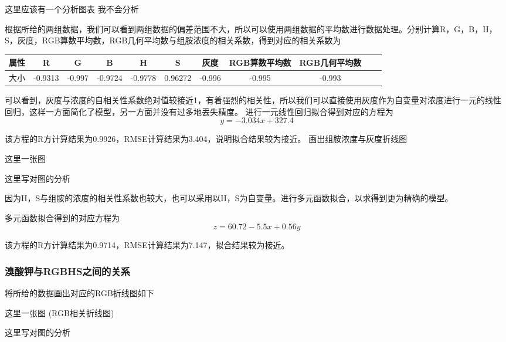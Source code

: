     这里应该有一个分析图表 我不会分析

    根据所给的两组数据，我们可以看到两组数据的偏差范围不大，所以可以使用两组数据的平均数进行数据处理。分别计算R，G，B，H，S，灰度，RGB算数平均数，RGB几何平均数与组胺浓度的相关系数，得到对应的相关系数为
    \begin{table}
        \begin{tabular}{|c|c|c|c|c|c|c|c|c|c|c|}
        \hline         
            属性 & R & G & B & H & S & 灰度 & RGB算数平均数 & RGB几何平均数 \\
        \hline
            大小 & -0.9313 & -0.997 & -0.9724 & -0.9778 & 0.96272 & -0.996 & -0.995 & -0.993 \\
        \hline
        \end{tabular}
    \end{table}
         
    
    
    可以看到，灰度与浓度的自相关性系数绝对值较接近1，有着强烈的相关性，所以我们可以直接使用灰度作为自变量对浓度进行一元的线性回归，这样一方面简化了模型，另一方面并没有过多地丢失精度。
   进行一元线性回归拟合得到对应的方程为
    $$ y = -3.034 x + 327.4$$

    该方程的R方计算结果为0.9926，RMSE计算结果为3.404，说明拟合结果较为接近。
    画出组胺浓度与灰度折线图
    
    这里一张图

    这里写对图的分析

    因为H，S与组胺的浓度的相关性系数也较大，也可以采用以H，S为自变量。进行多元函数拟合，以求得到更为精确的模型。
    
    多元函数拟合得到的对应方程为
    $$ z = 60.72 - 5.5 x + 0.56y$$

    该方程的R方计算结果为0.9714，RMSE计算结果为7.147，拟合结果较为接近。

    \subsubsection{溴酸钾与RGBHS之间的关系}
     
    将所给的数据画出对应的RGB折线图如下 

    这里一张图 (RGB相关折线图)    

    这里写对图的分析

